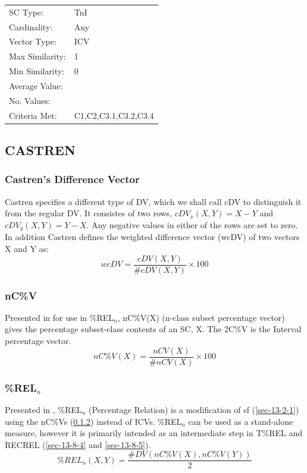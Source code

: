 \documentclass{article}
\begin{document}
\begin{center}
\begin{tabular}{ll}
 SC Type:         &  TnI                   \\
 Cardinality:     &  Any                   \\
 Vector Type:     &  ICV                   \\
 Max Similarity:  &  1                     \\
 Min Similarity:  &  0                     \\
 Average Value:   &                        \\
 No. Values:      &                        \\
 Criteria Met:    &  C1,C2,C3.1,C3.2,C3.4  \\
\end{tabular}
\end{center}
\subsection{CASTREN}
\label{sec-13-8}
\subsubsection{Castren's Difference Vector}
\label{sec-13-8-1}

Castren specifies a different type of DV, which we shall call cDV to
distinguish it from the regular DV. It consistes of two rows,
$cDV_{x}(X,Y)=X-Y$ and $cDV_{y}(X,Y)=Y-X$. Any negative values in
either of the rows are set to zero.  In addition Castren defines the
weighted difference vector (wcDV) of two vectors X and Y as:
$$wcDV=\frac{cDV(X,Y)}{\#cDV(X,Y)}\times 100$$
\subsubsection{nC\%V}
\label{sec-13-8-2}

Presented in \citet{Castren1994} for use in \%REL$_{n}$, nC\%V(X) (n-class
subset percentage vector) gives the percentage subset-class contents
of an SC, X. The 2C\%V is the Interval percentage vector.
$$nC\%V(X)=\frac{nCV(X)}{\#nCV(X)}\times 100$$
\subsubsection{\%REL$_{n}$}
\label{sec-13-8-3}

Presented in \citet{Castren1994}, \%REL$_{n}$ (Percentage Relation) is a
modification of sf (\ref{sec-13-2-1}) using the nC\%Vs (\ref{sec-13-8-2}) instead of
ICVs. \%REL$_{n}$ can be used as a stand-alone measure, however it is
primarily intended as an intermediate step in T\%REL and RECREL (\ref{sec-13-8-4}
and \ref{sec-13-8-5}). $$\%REL_n(X,Y)=\frac{\#DV(nC\%V(X),nC\%V(Y))}{2}$$
\end{document}
